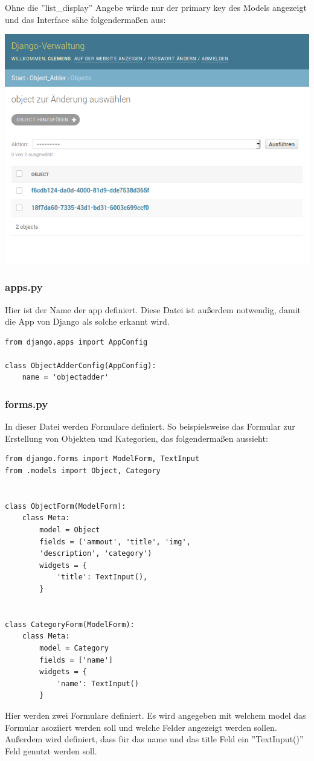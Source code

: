 \documentclass{article}
\begin{document}
Ohne die ''list\_display'' Angebe würde nur der primary key des Models angezeigt und das Interface sähe folgendermaßen aus:
\newline
\begin{center}
	\includegraphics[width=\linewidth]{django_admin_obj_pk.png}
\end{center}
\subsubsection{apps.py}
Hier ist der Name der app definiert. Diese Datei ist außerdem notwendig, damit die App von Django als solche erkannt wird.
\begin{verbatim}
from django.apps import AppConfig

class ObjectAdderConfig(AppConfig):
	name = 'objectadder'
\end{verbatim}
\subsubsection{forms.py}
In dieser Datei werden Formulare definiert. So beispielsweise das Formular zur Erstellung von Objekten und Kategorien, das folgendermaßen aussieht:
\begin{verbatim}
from django.forms import ModelForm, TextInput	
from .models import Object, Category
	
	
class ObjectForm(ModelForm):
	class Meta:
		model = Object
		fields = ('ammout', 'title', 'img', 
		'description', 'category')
		widgets = {
			'title': TextInput(),
		}
	
	
class CategoryForm(ModelForm):
	class Meta:
		model = Category
		fields = ['name']
		widgets = {
			'name': TextInput()
		}
\end{verbatim}
Hier werden zwei Formulare definiert. Es wird angegeben mit welchem model das Formular asoziiert werden soll und welche Felder angezeigt werden sollen. Außerdem wird definiert, dass für das name und das title Feld ein ''TextInput()'' Feld genutzt werden soll.
\end{document}
